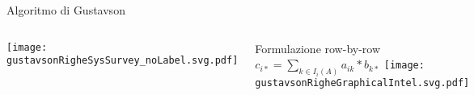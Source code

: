\begin{frame} {Algoritmo di Gustavson}
\begin{columns}
	\texttt{[image: gustavsonRigheSysSurvey\_noLabel.svg.pdf]}
	
  	Formulazione row-by-row $c_{i*} = \sum\limits_{k \in I_i(A)}  a_{ik} \ast  b_{k*}$
	\voidLine
	\voidLine
	\texttt{[image: gustavsonRigheGraphicalIntel.svg.pdf]}
	
\end{columns}

\end{frame}

